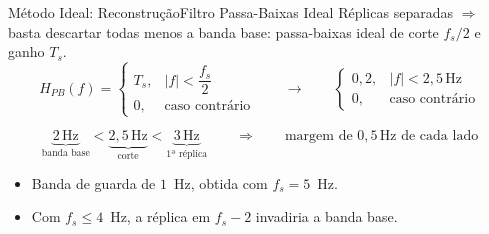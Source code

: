 \begin{frame}{Método Ideal: Reconstrução}{Filtro Passa-Baixas Ideal}
    \small
    Réplicas separadas $\Rightarrow$ basta descartar todas menos a banda base:
    passa-baixas ideal de corte $f_s/2$ e ganho $T_s$.
    \[
        H_{PB}(f) =
        \begin{cases}
            T_s, & |f| < \dfrac{f_s}{2}\\[4pt]
            0, & \text{caso contrário}
        \end{cases}
        \qquad\longrightarrow\qquad
        \begin{cases}
            0{,}2, & |f| < 2{,}5\,\text{Hz}\\
            0, & \text{caso contrário}
        \end{cases}
    \]

    \[
        \underbrace{2\,\text{Hz}}_{\text{banda base}} < \underbrace{2{,}5\,\text{Hz}}_{\text{corte}} < \underbrace{3\,\text{Hz}}_{\text{1ª réplica}}
        \qquad \Longrightarrow \qquad
        \text{margem de } 0{,}5\,\text{Hz de cada lado}
    \]

    \begin{itemize}
      \item Banda de guarda de $1$~Hz, obtida com $f_s = 5$~Hz.
      \item Com $f_s \le 4$~Hz, a réplica em $f_s - 2$ invadiria a banda base.
    \end{itemize}
\end{frame}

